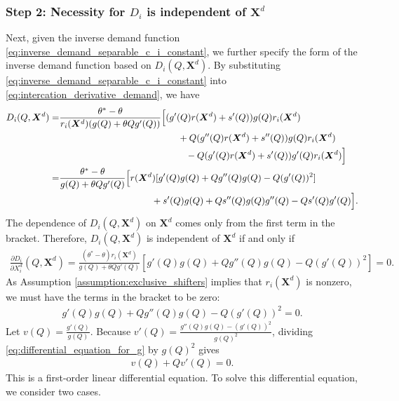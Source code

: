 \documentclass[11pt, a4paper]{article}
\begin{document}
\subsubsection*{Step 2: Necessity for $D_i$ is independent of $\bm{X}^{d}$}
Next, given the inverse demand function \eqref{eq:inverse_demand_separable_c_i_constant}, we further specify the form of the inverse demand function based on $D_i(Q, \bm{X}^{d})$.
By substituting \eqref{eq:inverse_demand_separable_c_i_constant} into \eqref{eq:intercation_derivative_demand}, we have
\begin{align}
    D_i(Q, \bm{X}^{d}) = &\frac{\theta^{*} - \theta}{r_i(\bm{X}^{d})(g(Q) + \theta Q g'(Q))}\Big[
    (g'(Q)r(\bm{X}^{d}) + s'(Q) )g(Q)r_i(\bm{X}^{d})\\
    & \hspace{4.5cm} + Q(g''(Q)r(\bm{X}^{d}) + s''(Q))g(Q)r_i(\bm{X}^{d}) \\
    &\hspace{4.8cm} - Q(g'(Q)r(\bm{X}^{d}) + s'(Q))g'(Q)r_i(\bm{X}^{d})\Big]\\
    =&\frac{\theta^{*} - \theta}{g(Q) + \theta Q g'(Q)}\Big[r(\bm{X}^{d})[g'(Q)g(Q) + Qg{''}(Q)g(Q) - Q (g'(Q))^{2}]\\
    & \hspace{3.5cm} + s'(Q)g(Q) + Qs''(Q)g(Q)g''(Q) - Qs'(Q)g'(Q)\Big].
\end{align}
The dependence of $D_i(Q, \bm{X}^{d})$ on $\bm{X}^{d}$ comes only from the first term in the bracket.
Therefore, $D_i(Q, \bm{X}^{d})$ is independent of $\bm{X}^{d}$ if and only if
\begin{align}
    \frac{\partial D_i}{\partial X^{d}_i}(Q, \bm{X}^{d}) =\frac{(\theta^{*} - \theta)r_i(\bm{X}^{d})}{g(Q) + \theta Q g'(Q)} [g'(Q)g(Q) + Qg{''}(Q)g(Q) - Q (g'(Q))^{2}] = 0.
\end{align}
As Assumption \ref{assumption:exclusive_shifters} implies that $r_i(\bm{X}^{d})$ is nonzero, we must have the terms in the bracket to be zero:
\begin{align}
    g'(Q)g(Q) + Qg{''}(Q)g(Q) - Q (g'(Q))^{2} = 0. \label{eq:differential_equation_for_g}
\end{align}
Let $v(Q) = \frac{g'(Q)}{g(Q)}$.
Because $v'(Q) = \frac{g''(Q)g(Q) - (g'(Q))^2}{g(Q)^2}$, dividing \eqref{eq:differential_equation_for_g} by $g(Q)^2$ gives
\begin{align}
    v(Q) + Qv'(Q) = 0. \label{eq:differential_equation_for_v}
\end{align}
This is a first-order linear differential equation.
To solve this differential equation, we consider two cases.
\end{document}
